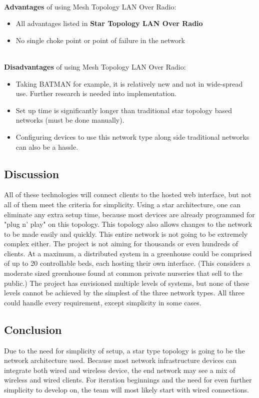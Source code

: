 \documentclass[onecolumn, draftclsnofoot,10pt, compsoc]{IEEEtran}
\begin{document}
		\noindent \\ \textbf{Advantages} of using Mesh Topology LAN Over Radio:
		\begin{itemize}
			\item All advantages listed in \textbf{Star Topology LAN Over Radio}
			\item No single choke point or point of failure in the network
		\end{itemize}

		\noindent \\ \textbf{Disadvantages} of using Mesh Topology LAN Over Radio:
		\begin{itemize}
			\item Taking BATMAN for example, it is relatively new and not in wide-spread use.  Further research is needed into implementation.
			\item Set up time is significantly longer than traditional star topology based networks (must be done manually).
			\item Configuring devices to use this network type along side traditional networks can also be a hassle.
		\end{itemize}


		\subsection{Discussion}
		All of these technologies will connect clients to the hosted web interface, but not all of them meet the criteria for simplicity.
		Using a star architecture, one can eliminate any extra setup time, because most devices are already programmed for "plug n' play" on this topology.
		This topology also allows changes to the network to be made easily and quickly.
		This entire network is not going to be extremely complex either.  The project is not aiming for thousands or even hundreds of clients.
		At a maximum, a distributed system in a greenhouse could be comprised of up to 20 controllable beds, each hosting their own interface.
		(This considers a moderate sized greenhouse found at common private nurseries that sell to the public.) 	The project has envisioned multiple levels of systems,
		but none of these levels cannot be achieved by the simplest of the three network types.  All three could handle every requirement, except simplicity in some cases.

		\subsection{Conclusion}
		Due to the need for simplicity of setup, a star type topology is going to be the network architecture used.
		Because most network infrastructure devices can integrate both wired and wireless device, the end network may see a mix of wireless and wired clients.
		For iteration beginnings and the need for even further simplicity to develop on, the team will most likely start with wired connections.
\end{document}
